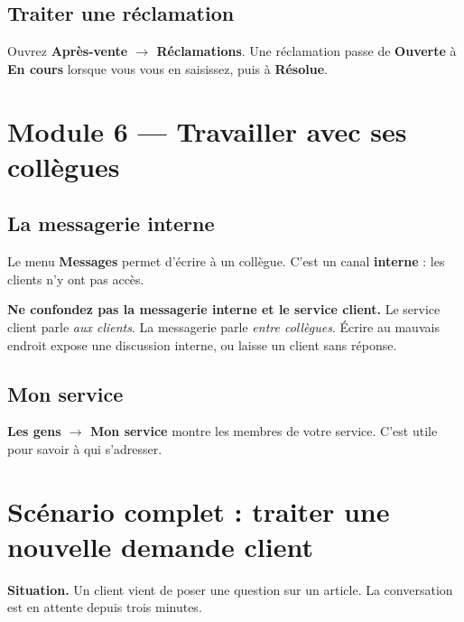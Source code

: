 \documentclass[11pt,a4paper]{report}
\begin{document}
\subsection{Traiter une réclamation}

Ouvrez \textbf{Après-vente $\rightarrow$ Réclamations}. Une réclamation passe de
\textbf{Ouverte} à \textbf{En cours} lorsque vous vous en saisissez, puis à
\textbf{Résolue}.

\section{Module 6 — Travailler avec ses collègues}

\subsection{La messagerie interne}

Le menu \textbf{Messages} permet d'écrire à un collègue. C'est un canal
\textbf{interne} : les clients n'y ont pas accès.

\begin{attention}
\textbf{Ne confondez pas la messagerie interne et le service client.} Le service
client parle \emph{aux clients}. La messagerie parle \emph{entre collègues}.
Écrire au mauvais endroit expose une discussion interne, ou laisse un client
sans réponse.
\end{attention}

\subsection{Mon service}

\textbf{Les gens $\rightarrow$ Mon service} montre les membres de votre service.
C'est utile pour savoir à qui s'adresser.

\section{Scénario complet : traiter une nouvelle demande client}

\begin{tcolorbox}[colback=garahFond,colframe=garahEncre,arc=4pt,boxrule=1pt]
\textbf{Situation.} Un client vient de poser une question sur un article. La
conversation est en attente depuis trois minutes.
\end{tcolorbox}
\end{document}
